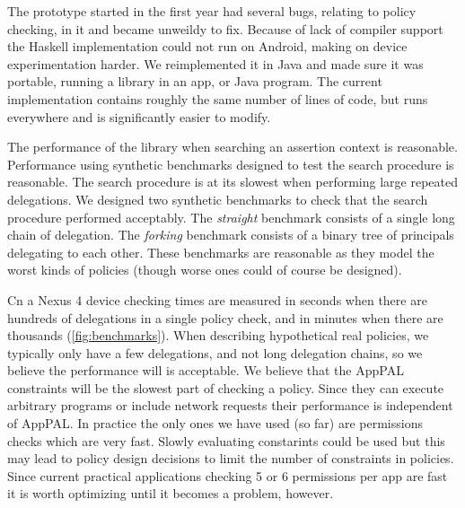\documentclass[a4paper]{scrartcl}
\begin{document}
The prototype started in the first year had several bugs, relating to policy checking, in it and became unweildy to fix.
Because of lack of compiler support the Haskell implementation could not run on Android, making on device experimentation harder.
We reimplemented it in Java and made sure it was portable, running a library in an app, or Java program.
The current implementation contains roughly the same number of lines of code, but runs everywhere and is significantly easier to modify.

The performance of the library when searching an assertion context is reasonable.
Performance using synthetic benchmarks designed to test the search procedure is reasonable.
The search procedure is at its slowest when performing large repeated delegations.
We designed two synthetic benchmarks to check that the search procedure performed acceptably.
The \emph{straight} benchmark consists of a single long chain of delegation.
The \emph{forking} benchmark consists of a binary tree of principals delegating to each other.
These benchmarks are reasonable as they model the worst kinds of policies (though worse ones could of course be designed).

Cn a Nexus 4 device checking times are measured in seconds when there are hundreds of delegations in a single policy check, and in minutes when there are thousands (\autoref{fig:benchmarks}).
When describing hypothetical real policies, we typically only have a few delegations, and not long delegation chains, so we believe the performance will is acceptable.
We believe that the AppPAL constraints will be the slowest part of checking a policy.
Since they can execute arbitrary programs or include network requests their performance is independent of AppPAL.
In practice the only ones we have used (so far) are permissions checks which are very fast.
Slowly evaluating constarints could be used but this may lead to policy design decisions to limit the number of constraints in policies.
Since current practical applications checking 5 or 6 permissions per app are fast it is worth optimizing until it becomes a problem, however.
\end{document}
